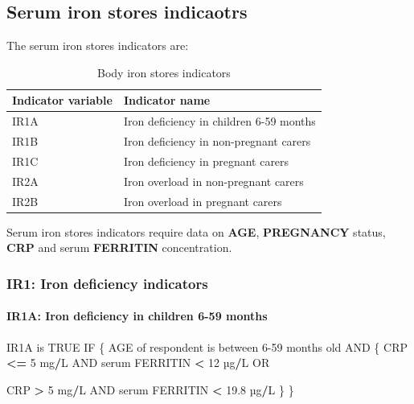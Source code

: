 \documentclass[12pt,a4paper]{article}
\newenvironment{Shaded}{\begin{snugshade}}{\end{snugshade}}
\newcommand{\DecValTok}[1]{\textcolor[rgb]{0.00,0.00,0.81}{#1}}
\newcommand{\FloatTok}[1]{\textcolor[rgb]{0.00,0.00,0.81}{#1}}
\newcommand{\NormalTok}[1]{#1}
\newcommand{\OperatorTok}[1]{\textcolor[rgb]{0.81,0.36,0.00}{\textbf{#1}}}
\newcommand{\OtherTok}[1]{\textcolor[rgb]{0.56,0.35,0.01}{#1}}
\newcommand{\StringTok}[1]{\textcolor[rgb]{0.31,0.60,0.02}{#1}}
\let\oldparagraph\paragraph
\renewcommand{\paragraph}[1]{\oldparagraph{#1}\mbox{}}
\begin{document}
\newpage

\hypertarget{serum-iron-stores-indicaotrs}{%
\subsection{Serum iron stores indicaotrs}\label{serum-iron-stores-indicaotrs}}

The serum iron stores indicators are:

\begin{table}[H]

\caption{\label{tab:iron-deficiency}Body iron stores indicators}
\centering
\begin{tabular}[t]{ll}
\toprule
\textbf{Indicator variable} & \textbf{Indicator name}\\
\midrule
\rowcolor{gray!6}  IR1A & Iron deficiency in children 6-59 months\\
IR1B & Iron deficiency in non-pregnant carers\\
\rowcolor{gray!6}  IR1C & Iron deficiency in pregnant carers\\
IR2A & Iron overload in non-pregnant carers\\
\rowcolor{gray!6}  IR2B & Iron overload in pregnant carers\\
\bottomrule
\end{tabular}
\end{table}

Serum iron stores indicators require data on \textbf{AGE}, \textbf{PREGNANCY} status, \textbf{CRP} and serum \textbf{FERRITIN} concentration.

\hypertarget{ir1-iron-deficiency-indicators}{%
\subsubsection{IR1: Iron deficiency indicators}\label{ir1-iron-deficiency-indicators}}

\hypertarget{ir1a-iron-deficiency-in-children-6-59-months}{%
\paragraph{IR1A: Iron deficiency in children 6-59 months}\label{ir1a-iron-deficiency-in-children-6-59-months}}

\begin{Shaded}
\begin{Highlighting}[]
\NormalTok{IR1A is }\OtherTok{TRUE}\NormalTok{ IF}
\NormalTok{  \{}
\NormalTok{    AGE of respondent is between }\DecValTok{6-59}\NormalTok{ months old AND}
\NormalTok{      \{}
\NormalTok{        CRP }\OperatorTok{<=}\StringTok{ }\DecValTok{5}\NormalTok{ mg}\OperatorTok{/}\NormalTok{L AND serum FERRITIN }\OperatorTok{<}\StringTok{ }\DecValTok{12}\NormalTok{ µg}\OperatorTok{/}\NormalTok{L OR}
     
\NormalTok{        CRP }\OperatorTok{>}\StringTok{ }\DecValTok{5}\NormalTok{ mg}\OperatorTok{/}\NormalTok{L AND serum FERRITIN }\OperatorTok{<}\StringTok{ }\FloatTok{19.8}\NormalTok{ µg}\OperatorTok{/}\NormalTok{L}
\NormalTok{      \}}
\NormalTok{  \}}
\end{Highlighting}
\end{Shaded}
\end{document}

